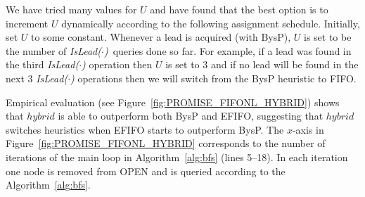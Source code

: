 \documentclass[journal]{IEEEtran}
\newcommand{\islead}[1]{{\em IsLead(#1)}}
\begin{document}
We have tried many values for $U$ and have found that the best option is to increment $U$ dynamically according to the following assignment schedule. Initially, set $U$ to some constant. Whenever a lead is acquired (with BysP), $U$ is set to be the number of \islead{$\cdot$}~queries done so far. For example, if a lead was found in the third \islead{$\cdot$} operation then $U$ is set to 3 and if no lead will be found in the next 3 \islead{$\cdot$} operations then we will switch from the BysP heuristic to FIFO. 


Empirical evaluation (see Figure~\ref{fig:PROMISE_FIFONL_HYBRID}) shows that \(hybrid\) is able to outperform both BysP and EFIFO, suggesting that $hybrid$ switches heuristics when EFIFO starts to outperform BysP. 
The $x$-axis in Figure~\ref{fig:PROMISE_FIFONL_HYBRID} corresponds to the number of iterations of the main loop in Algorithm~\ref{alg:bfs} (lines 5--18). 
In each iteration one node is removed from OPEN and is queried according to the Algorithm~\ref{alg:bfs}.




\end{document}
